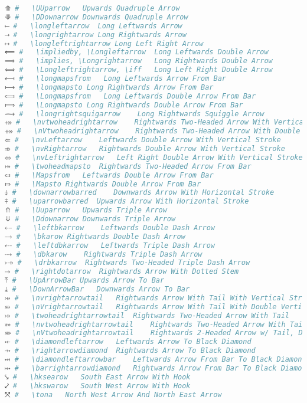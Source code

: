 \begin{lstlisting}[language=Julia, style=julia, linewidth=\textwidth]
⟰ #   \UUparrow   Upwards Quadruple Arrow
⟱ #   \DDownarrow Downwards Quadruple Arrow
⟵ #   \longleftarrow  Long Leftwards Arrow
⟶ #   \longrightarrow Long Rightwards Arrow
⟷ #   \longleftrightarrow Long Left Right Arrow
⟸ #   \impliedby, \Longleftarrow  Long Leftwards Double Arrow
⟹ #   \implies, \Longrightarrow   Long Rightwards Double Arrow
⟺ #   \Longleftrightarrow, \iff   Long Left Right Double Arrow
⟻ #   \longmapsfrom   Long Leftwards Arrow From Bar
⟼ #   \longmapsto Long Rightwards Arrow From Bar
⟽ #   \Longmapsfrom   Long Leftwards Double Arrow From Bar
⟾ #   \Longmapsto Long Rightwards Double Arrow From Bar
⟿ #   \longrightsquigarrow    Long Rightwards Squiggle Arrow
⤀ #   \nvtwoheadrightarrow    Rightwards Two-Headed Arrow With Vertical Stroke
⤁ #   \nVtwoheadrightarrow    Rightwards Two-Headed Arrow With Double Vertical Stroke
⤂ #   \nvLeftarrow    Leftwards Double Arrow With Vertical Stroke
⤃ #   \nvRightarrow   Rightwards Double Arrow With Vertical Stroke
⤄ #   \nvLeftrightarrow   Left Right Double Arrow With Vertical Stroke
⤅ #   \twoheadmapsto  Rightwards Two-Headed Arrow From Bar
⤆ #   \Mapsfrom   Leftwards Double Arrow From Bar
⤇ #   \Mapsto Rightwards Double Arrow From Bar
⤈ #   \downarrowbarred    Downwards Arrow With Horizontal Stroke
⤉ #   \uparrowbarred  Upwards Arrow With Horizontal Stroke
⤊ #   \Uuparrow   Upwards Triple Arrow
⤋ #   \Ddownarrow Downwards Triple Arrow
⤌ #   \leftbkarrow    Leftwards Double Dash Arrow
⤍ #   \bkarow Rightwards Double Dash Arrow
⤎ #   \leftdbkarrow   Leftwards Triple Dash Arrow
⤏ #   \dbkarow    Rightwards Triple Dash Arrow
⤐ #   \drbkarrow  Rightwards Two-Headed Triple Dash Arrow
⤑ #   \rightdotarrow  Rightwards Arrow With Dotted Stem
⤒ #   \UpArrowBar Upwards Arrow To Bar
⤓ #   \DownArrowBar   Downwards Arrow To Bar
⤔ #   \nvrightarrowtail   Rightwards Arrow With Tail With Vertical Stroke
⤕ #   \nVrightarrowtail   Rightwards Arrow With Tail With Double Vertical Stroke
⤖ #   \twoheadrightarrowtail  Rightwards Two-Headed Arrow With Tail
⤗ #   \nvtwoheadrightarrowtail    Rightwards Two-Headed Arrow With Tail With Vert. Stroke
⤘ #   \nVtwoheadrightarrowtail    Rightwards 2-Headed Arrow w/ Tail, Double Vert. Stroke
⤝ #   \diamondleftarrow   Leftwards Arrow To Black Diamond
⤞ #   \rightarrowdiamond  Rightwards Arrow To Black Diamond
⤟ #   \diamondleftarrowbar    Leftwards Arrow From Bar To Black Diamond
⤠ #   \barrightarrowdiamond   Rightwards Arrow From Bar To Black Diamond
⤥ #   \hksearow   South East Arrow With Hook
⤦ #   \hkswarow   South West Arrow With Hook
⤧ #   \tona   North West Arrow And North East Arrow

\end{lstlisting}
